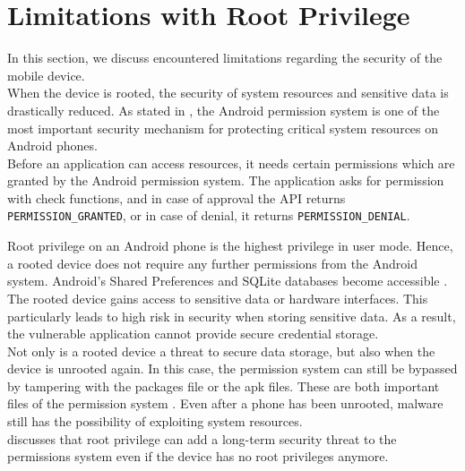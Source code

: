 \section{Limitations with Root Privilege} \label{limitations}
In this section, we discuss encountered limitations regarding the security of the mobile device. \\
When the device is rooted, the security of system resources and sensitive data is drastically reduced. As stated in \cite{ZhangWJWL14}, the Android permission system is one of the most important security mechanism for protecting critical system resources on Android phones. \\
Before an application can access resources, it needs certain permissions which are granted by the Android permission system. The application asks for permission with check functions, and in case of approval the API returns \texttt{PERMISSION\_GRANTED}, or in case of denial, it returns \texttt{PERMISSION\_DENIAL}.

Root privilege on an Android phone is the highest privilege in user mode. Hence, a rooted device does not require any further permissions from the Android system. Android's Shared Preferences and SQLite databases become accessible \cite{ShezanAI17}. The rooted device gains access to sensitive data or hardware interfaces. This particularly leads to high risk in security when storing sensitive data. As a result, the vulnerable application cannot provide secure credential storage. \\

Not only is a rooted device a threat to secure data storage, but also when the device is unrooted again. In this case, the permission system can still be bypassed by tampering with the packages file or the apk files. These are both important files of the permission system \cite{ZhangWJWL14}. Even after a phone has been unrooted, malware still has the possibility of exploiting system resources. \\ \cite{ZhangWJWL14} discusses that root privilege can add a long-term security threat to the permissions system even if the device has no root privileges anymore.